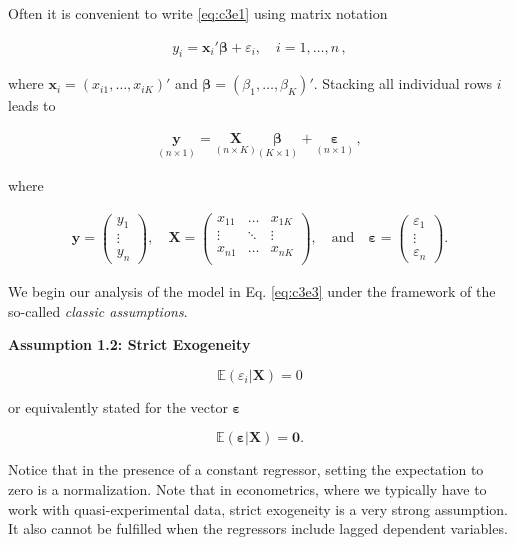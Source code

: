 \documentclass[
]{book}
\begin{document}
Often it is convenient to write \eqref{eq:c3e1} using matrix notation

\begin{align}
y_i = \mathbf{x}_i'\boldsymbol{\beta} +\varepsilon_i, \quad i=1,\dots,n \,,
\label{eq:c3e3}
\end{align}

where \(\mathbf{x}_i=(x_{i1},\dots,x_{iK})'\) and \(\boldsymbol{\beta}=(\beta_1,\dots,\beta_K)'\). Stacking all individual rows \(i\) leads to

\begin{align*}
\underset{(n\times 1)}{\mathbf{y}} = \underset{(n\times K)}{\mathbf{X}}\underset{(K\times 1)}{\boldsymbol{\beta}} + \underset{(n\times 1)}{\boldsymbol{\varepsilon}} \, ,
\end{align*}

where

\begin{align*}
\mathbf{y} = \left(\begin{matrix}y_1\\ \vdots\\y_n\end{matrix}\right),\quad
\mathbf{X} = \left( \begin{matrix}
x_{11} & \dots & x_{1K} \\ \vdots & \ddots & \vdots \\ x_{n1} &\dots&x_{nK}\\
\end{matrix}\right),\quad\text{and}\quad \boldsymbol{\varepsilon}=\left(\begin{matrix}\varepsilon_1\\ \vdots\\ \varepsilon_n\end{matrix}\right).
\end{align*}

We begin our analysis of the model in Eq. \eqref{eq:c3e3} under the framework of the so-called \emph{classic assumptions}.

\hfill\break

\textbf{Assumption 1.2: Strict Exogeneity}

\[\mathbb{E}(\varepsilon_i|\mathbf{X}) = 0\]

or equivalently stated for the vector \(\boldsymbol{\varepsilon}\)

\[\mathbb{E}(\boldsymbol{\varepsilon}|\mathbf{X}) = \mathbf{0}.\]

Notice that in the presence of a constant regressor, setting the expectation to zero is a normalization. Note that in econometrics, where we typically have to work with quasi-experimental data, strict exogeneity is a very strong assumption. It also cannot be fulfilled when the regressors include lagged dependent variables.
\end{document}
